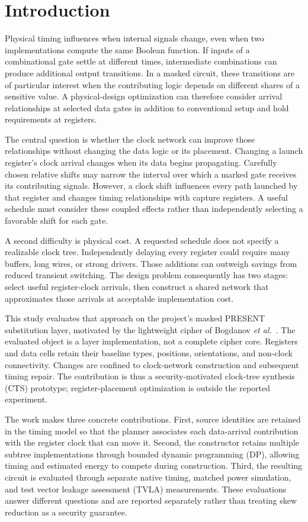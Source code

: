 \documentclass[conference]{IEEEtran}
\begin{document}
\section{Introduction}
Physical timing influences when internal signals change, even when two implementations compute the same Boolean function. If inputs of a combinational gate settle at different times, intermediate combinations can produce additional output transitions. In a masked circuit, these transitions are of particular interest when the contributing logic depends on different shares of a sensitive value. A physical-design optimization can therefore consider arrival relationships at selected data gates in addition to conventional setup and hold requirements at registers.

The central question is whether the clock network can improve those relationships without changing the data logic or its placement. Changing a launch register's clock arrival changes when its data begins propagating. Carefully chosen relative shifts may narrow the interval over which a marked gate receives its contributing signals. However, a clock shift influences every path launched by that register and changes timing relationships with capture registers. A useful schedule must consider these coupled effects rather than independently selecting a favorable shift for each gate.

A second difficulty is physical cost. A requested schedule does not specify a realizable clock tree. Independently delaying every register could require many buffers, long wires, or strong drivers. Those additions can outweigh savings from reduced transient switching. The design problem consequently has two stages: select useful register-clock arrivals, then construct a shared network that approximates those arrivals at acceptable implementation cost.

This study evaluates that approach on the project's masked PRESENT substitution layer, motivated by the lightweight cipher of Bogdanov \emph{et al.}~\cite{present}. The evaluated object is a layer implementation, not a complete cipher core. Registers and data cells retain their baseline types, positions, orientations, and non-clock connectivity. Changes are confined to clock-network construction and subsequent timing repair. The contribution is thus a security-motivated clock-tree synthesis (CTS) prototype; register-placement optimization is outside the reported experiment.

The work makes three concrete contributions. First, source identities are retained in the timing model so that the planner associates each data-arrival contribution with the register clock that can move it. Second, the constructor retains multiple subtree implementations through bounded dynamic programming (DP), allowing timing and estimated energy to compete during construction. Third, the resulting circuit is evaluated through separate native timing, matched power simulation, and test vector leakage assessment (TVLA) measurements. These evaluations answer different questions and are reported separately rather than treating skew reduction as a security guarantee.
\end{document}
